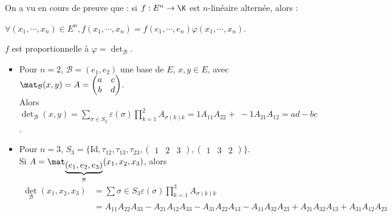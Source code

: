 \documentclass[12pt,a4paper]{report}
\begin{document}
On a vu en cours de preuve que : si $f : E^n \to \K$ est $n$-linéaire alternée, alors :
\begin{center}
$\forall (x_1,\cdots,x_n) \in E^n, f(x_1,\cdots,x_n) = f(e_1,\cdots,e_n)\varphi(x_1,\cdots,x_n)$.
\end{center}

$f$ est proportionnelle à $\varphi = \det_{\mathcal{B}}$. \\

\begin{exemple}{}
\begin{itemize}
	\item Pour $n=2$, $\mathcal{B} = (e_1,e_2)$ une base de $E$, $x,y \in E$, avec $\mat_{\mathcal{B}}(x,y) = A = \begin{pmatrix} a & c \\ b & d \end{pmatrix}$. \\
	
	Alors $\det_{\mathcal{B}}(x,y) = \displaystyle{\sum_{\sigma \in S_2} \varepsilon(\sigma) \prod_{k=1}^2 A_{\sigma(k)k}} = 1 A_{11}A_{22} + \; -1 A_{21}A_{12} = ad-bc$. 
	
	\item Pour $n = 3$, $S_3 = \{\text{Id},\tau_{12},\tau_{13},\tau_{23}, \begin{pmatrix} 1 & 2 & 3 \end{pmatrix}, \begin{pmatrix} 1 & 3 & 2 \end{pmatrix} \}$. \\
	
	Si $A = \mat_{\underbrace{(e_1,e_2,e_3)}_{\mathcal{B}}}(x_1,x_2,x_3)$, alors  
	\begin{align*}
	\det_{\mathcal{B}}(x_1,x_2,x_3) &= \sum{\sigma \in S_3} \varepsilon(\sigma) \prod_{k=1}^3 A_{\sigma(k)k} \\
	&= A_{11}A_{22}A_{33} - A_{21}A_{12}A_{33} - A_{31}A_{22}A_{13} - A_{11}A_{32}A_{23} + A_{21}A_{32}A_{13}+A_{31}A_{12}A_{23}
	\end{align*}
\end{itemize}
\end{exemple}
\end{document}
